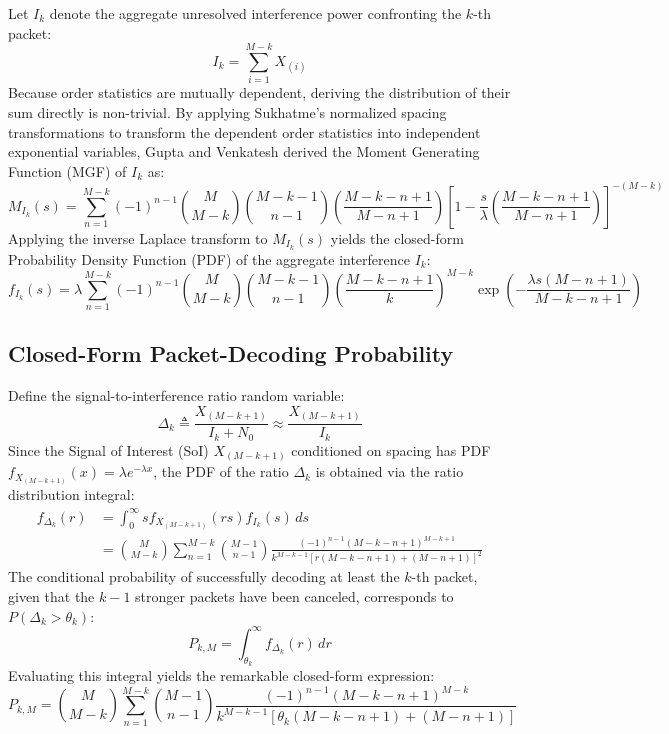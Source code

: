 Let $I_k$ denote the aggregate unresolved interference power confronting the $k$-th packet:
\begin{equation}
    I_k = \sum_{i=1}^{M-k} X_{(i)}
\end{equation}
Because order statistics are mutually dependent, deriving the distribution of their sum directly is non-trivial. By applying Sukhatme's normalized spacing transformations to transform the dependent order statistics into independent exponential variables, Gupta and Venkatesh derived the Moment Generating Function (MGF) of $I_k$ as:
\begin{equation}
    M_{I_k}(s) = \sum_{n=1}^{M-k} (-1)^{n-1} \binom{M}{M-k} \binom{M-k-1}{n-1} \left( \frac{M-k-n+1}{M-n+1} \right) \left[ 1 - \frac{s}{\lambda} \left( \frac{M-k-n+1}{M-n+1} \right) \right]^{-(M-k)}
\end{equation}
Applying the inverse Laplace transform to $M_{I_k}(s)$ yields the closed-form Probability Density Function (PDF) of the aggregate interference $I_k$:
\begin{equation}
    f_{I_k}(s) = \lambda \sum_{n=1}^{M-k} (-1)^{n-1} \binom{M}{M-k} \binom{M-k-1}{n-1} \left( \frac{M-k-n+1}{k} \right)^{M-k} \exp\left( -\frac{\lambda s (M-n+1)}{M-k-n+1} \right)
\end{equation}

\subsection{Closed-Form Packet-Decoding Probability}
Define the signal-to-interference ratio random variable:
\begin{equation}
    \Delta_k \triangleq \frac{X_{(M-k+1)}}{I_k + N_0} \approx \frac{X_{(M-k+1)}}{I_k}
\end{equation}
Since the Signal of Interest (SoI) $X_{(M-k+1)}$ conditioned on spacing has PDF $f_{X_{(M-k+1)}}(x) = \lambda e^{-\lambda x}$, the PDF of the ratio $\Delta_k$ is obtained via the ratio distribution integral:
\begin{align}
    f_{\Delta_k}(r) &= \int_0^\infty s f_{X_{(M-k+1)}}(r s) f_{I_k}(s) \, ds \nonumber \\
    &= \binom{M}{M-k} \sum_{n=1}^{M-k} \binom{M-1}{n-1} \frac{(-1)^{n-1} (M-k-n+1)^{M-k+1}}{k^{M-k-1} \left[ r(M-k-n+1) + (M-n+1) \right]^2}
\end{align}
The conditional probability of successfully decoding at least the $k$-th packet, given that the $k - 1$ stronger packets have been canceled, corresponds to $P(\Delta_k > \theta_k)$:
\begin{equation}
    P_{k,M} = \int_{\theta_k}^\infty f_{\Delta_k}(r) \, dr
\end{equation}
Evaluating this integral yields the remarkable closed-form expression:
\begin{equation}
    \label{eq:P_k_M_closed}
    P_{k,M} = \binom{M}{M-k} \sum_{n=1}^{M-k} \binom{M-1}{n-1} \frac{(-1)^{n-1} (M-k-n+1)^{M-k}}{k^{M-k-1} \left[ \theta_k (M-k-n+1) + (M-n+1) \right]}
\end{equation}

